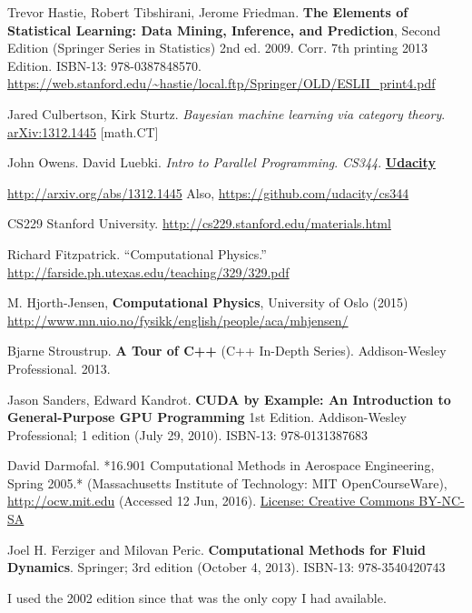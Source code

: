 \documentclass[10pt]{amsart}
\begin{document}
\begin{thebibliography}{9}
Trevor Hastie, Robert Tibshirani, Jerome Friedman.   \textbf{The Elements of Statistical Learning: Data Mining, Inference, and Prediction}, Second Edition (Springer Series in Statistics) 2nd ed. 2009. Corr. 7th printing 2013 Edition.  ISBN-13: 978-0387848570.  \url{https://web.stanford.edu/~hastie/local.ftp/Springer/OLD/ESLII_print4.pdf}

Jared Culbertson, Kirk Sturtz.  \emph{Bayesian machine learning via category theory}.  \href{http://arxiv.org/abs/1312.1445}{arXiv:1312.1445} [math.CT]

John Owens.  David Luebki.  \emph{Intro to Parallel Programming}.  \emph{CS344}.  \textbf{\href{https://www.udacity.com/}{Udacity}}  
  
\url{http://arxiv.org/abs/1312.1445} Also, \url{https://github.com/udacity/cs344}  

CS229 Stanford University.  \url{http://cs229.stanford.edu/materials.html}


Richard Fitzpatrick.  ``Computational Physics.''  \url{http://farside.ph.utexas.edu/teaching/329/329.pdf}

 M. Hjorth-Jensen, \textbf{Computational Physics}, University of Oslo (2015) \url{http://www.mn.uio.no/fysikk/english/people/aca/mhjensen/}

 Bjarne Stroustrup.  \textbf{A Tour of C++} (C++ In-Depth Series). Addison-Wesley Professional.   2013. 
 
Jason Sanders, Edward Kandrot.  \textbf{CUDA by Example: An Introduction to General-Purpose GPU Programming} 1st Edition.  Addison-Wesley Professional; 1 edition (July 29, 2010).  ISBN-13: 978-0131387683

  David Darmofal. *16.901 Computational Methods in Aerospace Engineering, Spring 2005.* (Massachusetts Institute of Technology: MIT OpenCourseWare), \url{http://ocw.mit.edu} (Accessed 12 Jun, 2016). \href{http://creativecommons.org/licenses/by-nc-sa/4.0/}{License: Creative Commons BY-NC-SA}

Joel H. Ferziger and Milovan Peric.  \textbf{Computational Methods for Fluid Dynamics}.  Springer; 3rd edition (October 4, 2013).  ISBN-13: 978-3540420743

I used the 2002 edition since that was the only copy I had available.  

\end{thebibliography}
\end{document}
